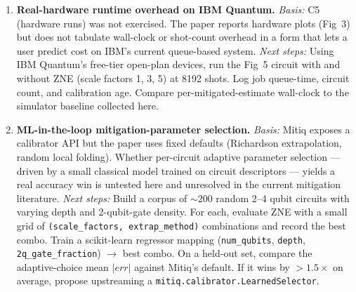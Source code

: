 \begin{enumerate}
\item \textbf{Real-hardware runtime overhead on IBM Quantum.}
\emph{Basis:} C5 (hardware runs) was not exercised. The paper reports hardware plots (Fig~3) but does not tabulate wall-clock or shot-count overhead in a form that lets a user predict cost on IBM's current queue-based system.
\emph{Next steps:} Using IBM Quantum's free-tier open-plan devices, run the Fig~5 circuit with and without ZNE (scale factors 1, 3, 5) at 8192 shots. Log job queue-time, circuit count, and calibration age. Compare per-mitigated-estimate wall-clock to the simulator baseline collected here.

\item \textbf{ML-in-the-loop mitigation-parameter selection.}
\emph{Basis:} Mitiq exposes a calibrator API but the paper uses fixed defaults (Richardson extrapolation, random local folding). Whether per-circuit adaptive parameter selection --- driven by a small classical model trained on circuit descriptors --- yields a real accuracy win is untested here and unresolved in the current mitigation literature.
\emph{Next steps:} Build a corpus of $\sim 200$ random 2--4 qubit circuits with varying depth and 2-qubit-gate density. For each, evaluate ZNE with a small grid of \texttt{(scale\_factors, extrap\_method)} combinations and record the best combo. Train a scikit-learn regressor mapping (\texttt{num\_qubits}, \texttt{depth}, \texttt{2q\_gate\_fraction}) $\to$ best combo. On a held-out set, compare the adaptive-choice mean $|err|$ against Mitiq's default. If it wins by $>1.5\times$ on average, propose upstreaming a \texttt{mitiq.calibrator.LearnedSelector}.

\end{enumerate}

